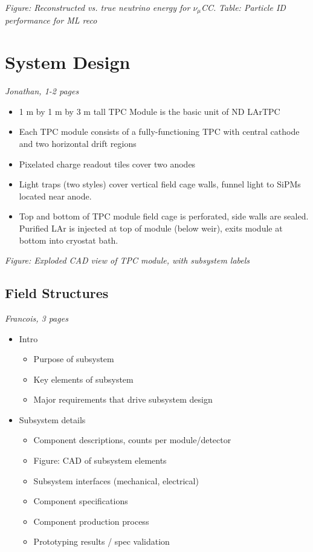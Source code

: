 {\it Figure: Reconstructed vs. true neutrino energy for $\nu_\mu$CC.}
{\it Table: Particle ID performance for ML reco}

\section{System Design}
\label{sec:lartpc-des}
{\it Jonathan, 1-2 pages}

\begin{itemize}
    \item 1 m by 1 m by 3 m tall TPC Module is the basic unit of ND LArTPC
    \item Each TPC module consists of a fully-functioning TPC with central cathode and two horizontal drift regions
    \item Pixelated charge readout tiles cover two anodes
    \item Light traps (two styles) cover vertical field cage walls, funnel light to SiPMs located near anode.
    \item Top and bottom of TPC module field cage is perforated, side walls are sealed.  Purified LAr is injected at top of module (below weir), exits module at bottom into cryostat bath.
\end{itemize}

{\it Figure: Exploded CAD view of TPC module, with subsystem labels}

\subsection{Field Structures}
\label{sec:lartpc-des-fieldstruc}
{\it Francois, 3 pages}

\begin{itemize}
    \item Intro 
    \begin{itemize}
        \item Purpose of subsystem
        \item Key elements of subsystem
        \item Major requirements that drive subsystem design
    \end{itemize}
    \item Subsystem details
    \begin{itemize}
        \item Component descriptions, counts per module/detector
        \item Figure: CAD of subsystem elements
        \item Subsystem interfaces (mechanical, electrical)
        \item Component specifications
        \item Component production process
        \item Prototyping results / spec validation
    \end{itemize}
\end{itemize}

